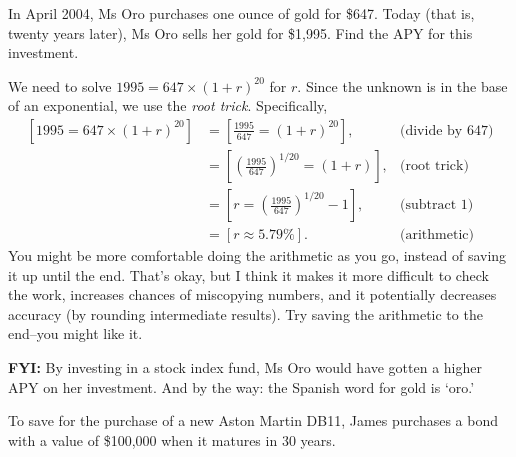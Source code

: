 \documentclass[12pt,fleqn,answers]{exam}
\begin{document}
\begin{questions}
\question [2] In April 2004, Ms Oro purchases one ounce of gold for \$647. 
Today (that is, twenty years later), Ms Oro sells her gold for \$1,995.
Find the APY for this investment.
\begin{solution}[3.0in]
We need to solve $1995 = 647 \times (1+r)^{20}$ for $r$. Since 
the unknown is in the base of an exponential, we use the \emph{root trick}.
Specifically,
\begin{align*}
    \left[1995 = 647 \times (1+r)^{20} \right] &= \left[\frac{1995}{647} = (1+r)^{20} \right], & \mbox{(divide by 647)}\\
               &= \left[\left(\frac{1995}{647}\right)^{1/20} = (1+r) \right], & \mbox{(root trick)} \\
               &= \left[r = \left(\frac{1995}{647}\right)^{1/20} - 1 \right], & \mbox{(subtract 1)}\\
               &= \left[ r \approx 5.79\% \right]. &\mbox{(arithmetic)}
\end{align*}
You might be more comfortable doing the arithmetic as you go, instead
of saving it up until the end. That's okay, but I think it makes it
more difficult to check the work, increases chances of miscopying
numbers, and it potentially decreases accuracy (by rounding intermediate results).
Try saving the arithmetic to the end--you might like it.

\textbf{FYI:} By investing in a stock index fund, Ms Oro would have
gotten a higher APY on her investment. And by the way: the Spanish word for gold is `oro.'


\end{solution}


\question To save for the purchase of a new Aston Martin DB11,
James purchases a bond with a value of \$100,000 when it matures
in 30 years.

\end{questions}
\end{document}
